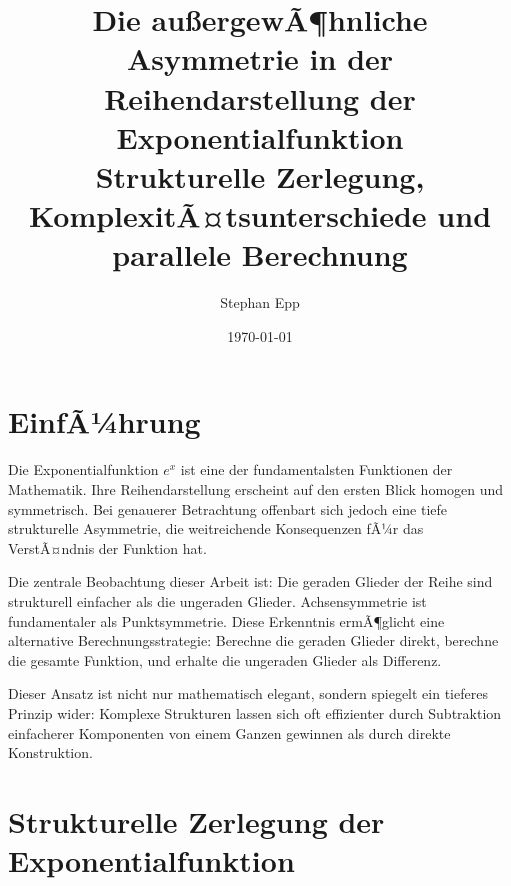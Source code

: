 ﻿\documentclass[a4paper,12pt]{article}
\title{Die au\ss ergewÃ¶hnliche Asymmetrie in der Reihendarstellung der
       Exponentialfunktion \\[0.5ex]
       \large Strukturelle Zerlegung, KomplexitÃ¤tsunterschiede und
       parallele Berechnung}
\author{Stephan Epp}
\date{\today}
\theoremstyle{definition}
\begin{document}
\maketitle
\tableofcontents
\newpage

\section{EinfÃ¼hrung}

Die Exponentialfunktion $e^x$ ist eine der fundamentalsten Funktionen der
Mathematik. Ihre Reihendarstellung erscheint auf den ersten Blick homogen und
symmetrisch. Bei genauerer Betrachtung offenbart sich jedoch eine tiefe
strukturelle Asymmetrie, die weitreichende Konsequenzen fÃ¼r das VerstÃ¤ndnis der
Funktion hat.

Die zentrale Beobachtung dieser Arbeit ist: Die geraden Glieder der Reihe sind
strukturell einfacher als die ungeraden Glieder. Achsensymmetrie ist
fundamentaler als Punktsymmetrie. Diese Erkenntnis ermÃ¶glicht eine alternative
Berechnungsstrategie: Berechne die geraden Glieder direkt, berechne die gesamte
Funktion, und erhalte die ungeraden Glieder als Differenz.

Dieser Ansatz ist nicht nur mathematisch elegant, sondern spiegelt ein tieferes
Prinzip wider: Komplexe Strukturen lassen sich oft effizienter durch Subtraktion
einfacherer Komponenten von einem Ganzen gewinnen als durch direkte Konstruktion.

\section{Strukturelle Zerlegung der Exponentialfunktion}
\end{document}
